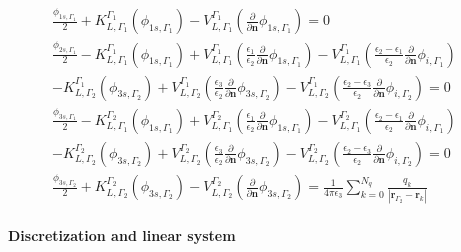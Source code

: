 \begin{align} \label{eq:integral_eq_lspr_nobc_system}
\frac{\phi_{1s,\Gamma_1}}{2}+ K_{L,\Gamma_1}^{\Gamma_1}(\phi_{1s,\Gamma_1}) - V_{L,\Gamma_1}^{\Gamma_1} \left(\frac{\partial}{\partial \mathbf{n}}\phi_{1s,\Gamma_1} \right) = 0 & \nonumber \\
\frac{\phi_{2s,\Gamma_1}}{2} - K_{L,\Gamma_1}^{\Gamma_1}(\phi_{1s,\Gamma_1}) + V_{L,\Gamma_1}^{\Gamma_1} \left(\frac{\epsilon_1}{\epsilon_2}\frac{\partial}{\partial \mathbf{n}}\phi_{1s,\Gamma_1} \right) - V_{L,\Gamma_1}^{\Gamma_1} \left(\frac{\epsilon_2-\epsilon_1}{\epsilon_2}\frac{\partial}{\partial \mathbf{n}}\phi_{i,\Gamma_1} \right) & \nonumber\\
 - K_{L,\Gamma_2}^{\Gamma_1}(\phi_{3s,\Gamma_2}) + V_{L,\Gamma_2}^{\Gamma_1} \left(\frac{\epsilon_3}{\epsilon_2}\frac{\partial}{\partial \mathbf{n}}\phi_{3s,\Gamma_2} \right)  - V_{L,\Gamma_2}^{\Gamma_1} \left(\frac{\epsilon_2 -\epsilon_3}{\epsilon_2}\frac{\partial}{\partial \mathbf{n}}\phi_{i,\Gamma_2} \right) = 0 &  \nonumber \\
\frac{\phi_{3s,\Gamma_1}}{2} - K_{L,\Gamma_1}^{\Gamma_2}(\phi_{1s,\Gamma_1}) + V_{L,\Gamma_1}^{\Gamma_2} \left(\frac{\epsilon_1}{\epsilon_2}\frac{\partial}{\partial \mathbf{n}}\phi_{1s,\Gamma_1} \right) - V_{L,\Gamma_1}^{\Gamma_2} \left(\frac{\epsilon_2-\epsilon_1}{\epsilon_2}\frac{\partial}{\partial \mathbf{n}}\phi_{i,\Gamma_1} \right) & \nonumber\\
 - K_{L,\Gamma_2}^{\Gamma_2}(\phi_{3s,\Gamma_2}) + V_{L,\Gamma_2}^{\Gamma_2} \left(\frac{\epsilon_3}{\epsilon_2}\frac{\partial}{\partial \mathbf{n}}\phi_{3s,\Gamma_2} \right)  - V_{L,\Gamma_2}^{\Gamma_2} \left(\frac{\epsilon_2 -\epsilon_3}{\epsilon_2}\frac{\partial}{\partial \mathbf{n}}\phi_{i,\Gamma_2} \right) = 0 &  \nonumber \\
\frac{\phi_{3s,\Gamma_2}}{2} + K_{L,\Gamma_2}^{\Gamma_2}(\phi_{3s,\Gamma_2}) - V_{L,\Gamma_2}^{\Gamma_2} \left( \frac{\partial}{\partial \mathbf{n}} \phi_{3s,\Gamma_2} \right) = \frac{1}{4\pi\epsilon_3} \sum_{k=0}^{N_q} \frac{q_k}{|\mathbf{r}_{\Gamma_2} - \mathbf{r}_k|} &
\end{align}


\paragraph{Discretization and linear system}

